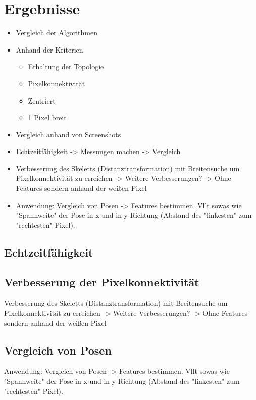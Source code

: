 \chapter{Ergebnisse}
\begin{itemize}
	\item Vergleich der Algorithmen
	\item Anhand der Kriterien
	\begin{itemize}
		\item Erhaltung der Topologie
		\item Pixelkonnektivität
		\item Zentriert
		\item 1 Pixel breit
	\end{itemize}
	\item Vergleich anhand von Screenshots
	\item Echtzeitfähigkeit -> Messungen machen -> Vergleich
	\item Verbesserung des Skeletts (Distanztransformation) mit Breitensuche um Pixelkonnektivität zu erreichen -> Weitere Verbesserungen? -> Ohne Features sondern anhand der weißen Pixel
	\item Anwendung: Vergleich von Posen -> Features bestimmen. Vllt sowas wie "Spannweite" der Pose in x und in y Richtung (Abstand des "linkesten" zum "rechtesten" Pixel). 
\end{itemize}

\section{Echtzeitfähigkeit}
\section{Verbesserung der Pixelkonnektivität}
Verbesserung des Skeletts (Distanztransformation) mit Breitensuche um Pixelkonnektivität zu erreichen -> Weitere Verbesserungen? -> Ohne Features sondern anhand der weißen Pixel
\section{Vergleich von Posen}
Anwendung: Vergleich von Posen -> Features bestimmen. Vllt sowas wie "Spannweite" der Pose in x und in y Richtung (Abstand des "linkesten" zum "rechtesten" Pixel). 